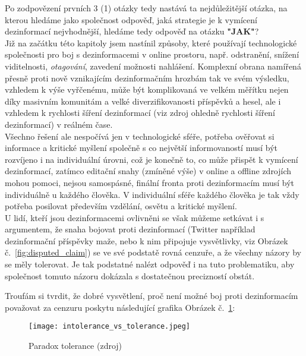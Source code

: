 Po zodpovězení prvních 3 (1) otázky tedy nastává ta nejdůležitější otázka, na kterou hledáme jako společnost odpověď, jaká strategie je k vymícení dezinformací nejvhodnější, hledáme tedy odpověď na otázku \textbf{"JAK"}?\\

Již na začátku této kapitoly jsem nastínil způsoby, které používají technologické společnosti pro boj s dezinformacemi v online prostoru,  např. odstranění, snížení viditelnosti, \textit{otagování}, zavedení možnosti nahlášení. Komplexní obrana namířená přesně proti nově vznikajícím dezinformačním hrozbám tak ve svém výsledku, vzhledem k výše vyřčenému, může být komplikovaná ve velkém měřítku nejen díky masivním komunitám a velké diverzifikovanosti příspěvků a hesel, ale i vzhledem k rychlosti šíření dezinformací (viz zdroj ohledně rychlosti šíření dezinformací) v reálném čase.\\

Všechno řešení ale nespočívá jen v technologické sféře, potřeba ověřovat si informace a kritické myšlení společně s co největší informovaností musí být rozvíjeno i na individuální úrovni, což je konečně to, co může přispět k vymícení dezinformací, zatímco editační snahy (zmíněné výše) v online a offline zdrojích mohou pomoci, nejsou samospásné, finální fronta proti dezinformacím musí být individuálně u každého člověka. V individuální sféře každého člověka je tak vždy potřeba posilovat především vzdělání, osvětu a kritické myšlení.\\

U lidí, kteří jsou dezinformacemi ovlivněni se však můžeme setkávat i s argumentem, že snaha bojovat proti dezinformací (Twitter například dezinformační příspěvky maže, nebo k nim připojuje vysvětlivky, viz Obrázek č.~\ref{fig:disputed_claim}) se ve své podstatě rovná cenzuře, a že všechny názory by se měly tolerovat. Je tak podstatné nalézt odpověď i na tuto problematiku, aby společnost tomuto názoru dokázala s dostatečnou precizností obstát.\\

\newpage

Troufám si tvrdit, že dobré vysvětlení, proč není možné boj proti dezinformacím považovat za cenzuru poskytu následující grafika Obrázek č.~\ref{fig:tolerance_paradox}:\\

\begin{figure}[htbp]
  \centering
  \texttt{[image: intolerance\_vs\_tolerance.jpeg]}
  \caption{Paradox tolerance (zdroj)}
  \label{fig:tolerance_paradox}
\end{figure}

